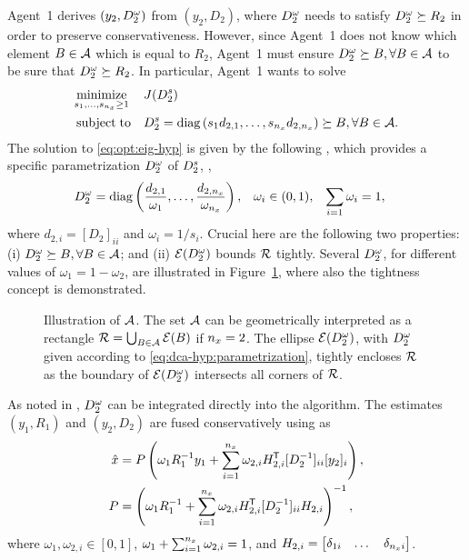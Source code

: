 Agent~1 derives $(y_2,\Domega_2)$ from $(y_2,D_2)$, where $\Domega_2$ needs to satisfy $\Domega_2\succeq R_2$ in order to preserve conservativeness. However, since Agent~1 does not know which element $B\in\calA$ which is equal to $R_2$, Agent~1 must ensure $\Domega_2\succeq B,\forall B\in\calA$ to be sure that $\Domega_2\succeq R_2$. In particular, Agent~1 wants to solve
\begin{equation} \label{eq:opt:eig-hyp}
\begin{aligned}
	& \underset{s_1,\dots,s_{\nx}\geq1}{\minimize} & & J(\Ds_2) \\
	& \subjectto & & \Ds_2 = \diag\left(s_1d_{2,1},\dots,s_{\nx}d_{2,\nx}\right) \succeq B, \forall B\in\calA.	
\end{aligned}	
\end{equation}
The solution to \eqref{eq:opt:eig-hyp} is given by the following \cite[Theorem~3.12]{Forsling2023Phd}, which provides a specific parametrization $\Domega_2$ of $\Ds_2$, \ie,
\begin{align}
	\Domega_2 &= \diag\left(\frac{d_{2,1}}{\omega_1},\dots,\frac{d_{2,\nx}}{\omega_{\nx}}\right), &
	\omega_i &\in (0,1), &
	\sum_{i=1} \omega_i &= 1,	
	\label{eq:dca-hyp:parametrization}
\end{align}
where $d_{2,i}=[D_2]_{ii}$ and $\omega_i=1/s_i$. Crucial here are the following two properties: (i) $\Domega_2\succeq B,\forall B\in\calA$; and (ii) $\calE(\Domega_2)$ bounds $\calR$ tightly. Several $\Domega_2$, for different values of $\omega_1=1-\omega_2$, are illustrated in Figure~\ref{fig:dca:hyperrectangle-enclosing}, where also the tightness concept is demonstrated.

\begin{figure}[tb]
	\centering
	\begin{tikzpicture}[scale=.8]
		
	\end{tikzpicture}
	\caption{Illustration of $\calA$. The set $\calA$ can be geometrically interpreted as a rectangle $\calR=\bigcup_{B\in\calA}\calE(B)$ if $\nx=2$. The ellipse $\calE(\Domega_2)$, with $\Domega_2$ given according to \eqref{eq:dca-hyp:parametrization}, tightly encloses $\calR$ as the boundary of $\calE(\Domega_2)$ intersects all corners of $\calR$.}
	\label{fig:dca:hyperrectangle-enclosing}
\end{figure}


As noted in \cite{Forsling2019Fusion}, $\Domega_2$ can be integrated directly into the \abbrCI algorithm. The estimates $(y_1,R_1)$ and $(y_2,D_2)$ are fused conservatively using \abbrCI as
\begin{subequations} \label{eq:dca-hyp:ci}
\begin{align}
	\xhat &= P\left(\omega_1R_1\inv y_1 + \sum_{i=1}^{\nx} \omega_{2,i} H_{2,i}\trnsp [D_2\inv]_{ii}[y_2]_i \right), \\
	P &= \left(\omega_1R_1\inv + \sum_{i=1}^{\nx} \omega_{2,i} H_{2,i}\trnsp [D_2\inv]_{ii}H_{2,i} \right)\inv,
\end{align}	
\end{subequations}
where $\omega_1,\omega_{2,i}\in[0,1]$, $\omega_1+\sum_{i=1}^{\nx}\omega_{2,i}=1$, and $H_{2,i} = \BBM \delta_{1i} & \dots & \delta_{\nx i} \EBM$. 

